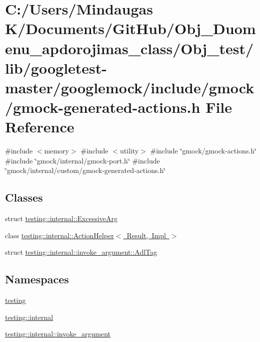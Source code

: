 \hypertarget{_obj__test_2lib_2googletest-master_2googlemock_2include_2gmock_2gmock-generated-actions_8h}{}\section{C\+:/\+Users/\+Mindaugas K/\+Documents/\+Git\+Hub/\+Obj\+\_\+\+Duomenu\+\_\+apdorojimas\+\_\+class/\+Obj\+\_\+test/lib/googletest-\/master/googlemock/include/gmock/gmock-\/generated-\/actions.h File Reference}
\label{_obj__test_2lib_2googletest-master_2googlemock_2include_2gmock_2gmock-generated-actions_8h}
{\ttfamily \#include $<$memory$>$}\newline
{\ttfamily \#include $<$utility$>$}\newline
{\ttfamily \#include \char`\"{}gmock/gmock-\/actions.\+h\char`\"{}}\newline
{\ttfamily \#include \char`\"{}gmock/internal/gmock-\/port.\+h\char`\"{}}\newline
{\ttfamily \#include \char`\"{}gmock/internal/custom/gmock-\/generated-\/actions.\+h\char`\"{}}\newline
\subsection*{Classes}
\begin{DoxyCompactItemize}
\item 
struct \mbox{\hyperlink{structtesting_1_1internal_1_1_excessive_arg}{testing\+::internal\+::\+Excessive\+Arg}}
\item 
class \mbox{\hyperlink{classtesting_1_1internal_1_1_action_helper}{testing\+::internal\+::\+Action\+Helper$<$ Result, Impl $>$}}
\item 
struct \mbox{\hyperlink{structtesting_1_1internal_1_1invoke__argument_1_1_adl_tag}{testing\+::internal\+::invoke\+\_\+argument\+::\+Adl\+Tag}}
\end{DoxyCompactItemize}
\subsection*{Namespaces}
\begin{DoxyCompactItemize}
\item 
 \mbox{\hyperlink{namespacetesting}{testing}}
\item 
 \mbox{\hyperlink{namespacetesting_1_1internal}{testing\+::internal}}
\item 
 \mbox{\hyperlink{namespacetesting_1_1internal_1_1invoke__argument}{testing\+::internal\+::invoke\+\_\+argument}}
\end{DoxyCompactItemize}
